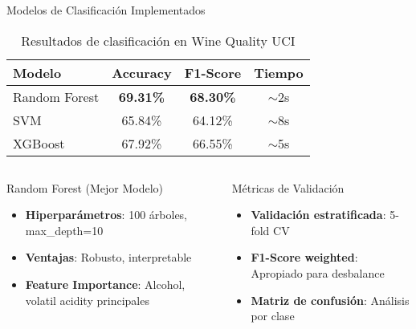 \documentclass[aspectratio=169]{beamer}
\begin{document}
\begin{frame}{Modelos de Clasificación Implementados}
    \begin{table}
        \centering
        \begin{tabular}{lccc}
            \toprule
            \textbf{Modelo} & \textbf{Accuracy} & \textbf{F1-Score} & \textbf{Tiempo} \\
            \midrule
            Random Forest & \textbf{69.31\%} & \textbf{68.30\%} & $\sim$2s \\
            SVM & 65.84\% & 64.12\% & $\sim$8s \\
            XGBoost & 67.92\% & 66.55\% & $\sim$5s \\
            \bottomrule
        \end{tabular}
        \caption{Resultados de clasificación en Wine Quality UCI}
    \end{table}
    
    \vspace{0.5cm}
    
    \begin{columns}[T]
        \begin{column}{0.48\textwidth}
            \begin{block}{Random Forest (Mejor Modelo)}
                \begin{itemize}
                    \item \textbf{Hiperparámetros}: 100 árboles, max\_depth=10
                    \item \textbf{Ventajas}: Robusto, interpretable
                    \item \textbf{Feature Importance}: Alcohol, volatil acidity principales
                \end{itemize}
            \end{block}
        \end{column}
        
        \begin{column}{0.48\textwidth}
            \begin{alertblock}{Métricas de Validación}
                \begin{itemize}
                    \item \textbf{Validación estratificada}: 5-fold CV
                    \item \textbf{F1-Score weighted}: Apropiado para desbalance
                    \item \textbf{Matriz de confusión}: Análisis por clase
                \end{itemize}
            \end{alertblock}
        \end{column}
    \end{columns}
\end{frame}
\end{document}
